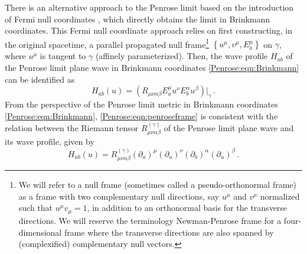 There is an alternative approach to the Penrose limit based on the introduction of Fermi null coordinates
\cite{Blau:2006ar}, which directly obtains the limit in Brinkmann coordinates. This Fermi null
coordinate approach relies on first constructing, in the original spacetime, a parallel propagated null
frame\footnote{We will refer to a null frame (sometimes called a pseudo-orthonormal frame) as a frame with two
	complementary null directions, say $u^{\mu}$ and $v^{\mu}$ normalized such that $u^{\mu} v_{\mu} = 1$, in addition
	to an orthonormal basis for the transverse directions. We will reserve the terminology Newman-Penrose frame for a
	four-dimensional frame where the transverse directions are also spanned by (complexified) complementary null
	vectors.} $\left\lbrace u^{\mu}, v^{\mu}, E^{\mu}_a \right \rbrace$ on $\gamma$, where $u^{\mu}$ is tangent to
$\gamma$ (affinely parameterized). Then, the wave profile $H_{ab}$ of the Penrose limit plane wave in Brinkmann coordinates \eqref{Penrose:eqn:Brinkmann} can be identified as \cite{Blau:2006ar,blau2011plane}
\begin{equation}\label{Penrose:eqn:penroseframe}
H_{ab}(u) = \left(R_{\mu \nu \alpha \beta} E^{\mu}_a u^{\nu} E^{\alpha}_b u^{\beta} \right)|_{\gamma} \, .
\end{equation}
From the perspective of the Penrose limit metric in Brinkmann coordinates \eqref{Penrose:eqn:Brinkmann}, \eqref{Penrose:eqn:penroseframe} is consistent with the relation between the Riemann tensor $R^{(\gamma)}_{\mu \nu \alpha \beta}$ of the Penrose limit plane wave and its wave profile, given by
\begin{equation}\label{Penrose:eqn:HRplanewave}
H_{ab}(u) = R^{(\gamma)}_{\mu \nu \alpha \beta} \left(\partial_a\right)^{\mu} (\partial_u)^{\nu}  \left(\partial_b\right)^{\alpha} (\partial_u)^{\beta}   \, .
\end{equation}

